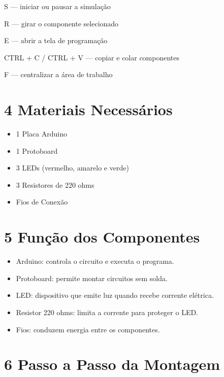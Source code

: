 \documentclass[12pt,a4paper]{article}
\begin{document}
\begin{tcolorbox}

S --- iniciar ou pausar a simulação

R --- girar o componente selecionado

E --- abrir a tela de programação

CTRL + C / CTRL + V --- copiar e colar componentes

F --- centralizar a área de trabalho

\end{tcolorbox}

\section*{4 Materiais Necessários}

\begin{itemize}

\item 1 Placa Arduino
\item 1 Protoboard
\item 3 LEDs (vermelho, amarelo e verde)
\item 3 Resistores de 220 ohms
\item Fios de Conexão

\end{itemize}

\section*{5 Função dos Componentes}

\begin{itemize}

\item Arduino: controla o circuito e executa o programa.
\item Protoboard: permite montar circuitos sem solda.
\item LED: dispositivo que emite luz quando recebe corrente elétrica.
\item Resistor 220 ohms: limita a corrente para proteger o LED.
\item Fios: conduzem energia entre os componentes.

\end{itemize}


\newpage
\section*{6 Passo a Passo da Montagem}
\end{document}
